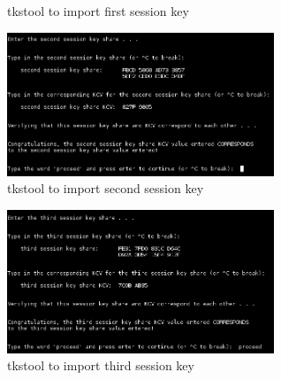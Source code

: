 \documentclass[12pt]{report}
\begin{document}
\begin{itemize}
\begin{itemize}
\begin{itemize}
\begin{figure}[H]
                                    \caption{tkstool to import first session key}
                                \end{figure}
                                \begin{figure}[H]
                                    \centering
                                    \includegraphics[width=80mm]{Images/tkstool-import-sharedSecret4.png}
                                    \caption{tkstool to import second session key}
                                \end{figure}
                                \begin{figure}[H]
                                    \centering
                                    \includegraphics[width=80mm]{Images/tkstool-import-sharedSecret5.png}
                                    \caption{tkstool to import third session key}
                                \end{figure}
                        \end{itemize}
                \end{itemize}
    \end{itemize}
\end{document}
